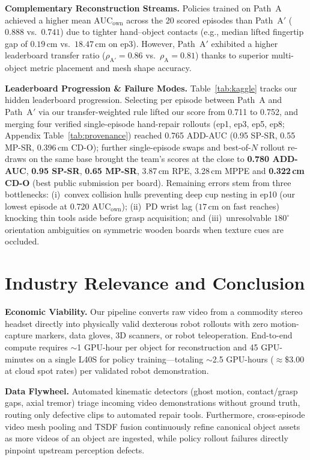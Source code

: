 \documentclass[10pt]{nvidiaextabstract}
\newcommand{\ownauc}{\ensuremath{\mathrm{AUC}_{\text{own}}}\xspace}
\begin{document}
\textbf{Complementary Reconstruction Streams.} Policies trained on Path~A achieved a higher mean $\ownauc$ across the 20 scored episodes than Path~A$'$ ($0.888$ vs.\ $0.741$) due to tighter hand--object contacts (e.g., median lifted fingertip gap of $0.19$\,cm vs.\ $18.47$\,cm on ep3). However, Path~A$'$ exhibited a higher leaderboard transfer ratio ($\rho_{\text{A}'}=0.86$ vs.\ $\rho_{\text{A}}=0.81$) thanks to superior multi-object metric placement and mesh shape accuracy.

\textbf{Leaderboard Progression \& Failure Modes.} Table~\ref{tab:kaggle} tracks our hidden leaderboard progression. Selecting per episode between Path~A and Path~A$'$ via our transfer-weighted rule lifted our score from 0.711 to 0.752, and merging four verified single-episode hand-repair rollouts (ep1, ep3, ep5, ep8; Appendix Table~\ref{tab:provenance}) reached 0.765 ADD-AUC (0.95 SP-SR, 0.55 MP-SR, 0.396\,cm CD-O); further single-episode swaps and best-of-$N$ rollout re-draws on the same base brought the team's scores at the close to \textbf{0.780 ADD-AUC}, \textbf{0.95 SP-SR}, \textbf{0.65 MP-SR}, 3.87\,cm RPE, 3.28\,cm MPPE and \textbf{0.322\,cm CD-O} (best public submission per board). Remaining errors stem from three bottlenecks: (i)~convex collision hulls preventing deep cup nesting in ep10 (our lowest episode at 0.720 \ownauc); (ii)~PD wrist lag ($17$\,cm on fast reaches) knocking thin tools aside before grasp acquisition; and (iii)~unresolvable $180^\circ$ orientation ambiguities on symmetric wooden boards when texture cues are occluded.

\section{Industry Relevance and Conclusion}
\label{sec:industry}

\textbf{Economic Viability.} Our pipeline converts raw video from a commodity stereo headset directly into physically valid dexterous robot rollouts with zero motion-capture markers, data gloves, 3D scanners, or robot teleoperation. End-to-end compute requires $\sim$1 GPU-hour per object for reconstruction and 45 GPU-minutes on a single L40S for policy training—totaling $\sim$2.5 GPU-hours ($\approx\$3.00$ at cloud spot rates) per validated robot demonstration.

\textbf{Data Flywheel.} Automated kinematic detectors (ghost motion, contact/grasp gaps, axial tremor) triage incoming video demonstrations without ground truth, routing only defective clips to automated repair tools. Furthermore, cross-episode video mesh pooling and TSDF fusion continuously refine canonical object assets as more videos of an object are ingested, while policy rollout failures directly pinpoint upstream perception defects.
\end{document}
